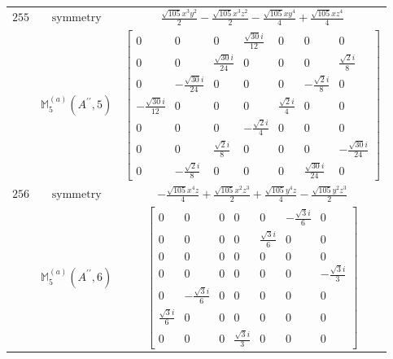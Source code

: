 \documentclass[fleqn,8pt,landscape]{jsarticle}
\begin{document}
\begin{longtable}{ccc}
$ 255 $ & $ \text{symmetry} $ & $ \frac{\sqrt{105} x^{3} y^{2}}{2} - \frac{\sqrt{105} x^{3} z^{2}}{2} - \frac{\sqrt{105} x y^{4}}{4} + \frac{\sqrt{105} x z^{4}}{4} $ \\
$  $ & $ \mathbb{M}_{5}^{(a)}(A^{\prime\prime},5) $ & $ \begin{bmatrix} 0 & 0 & 0 & \frac{\sqrt{30} i}{12} & 0 & 0 & 0 \\ 0 & 0 & \frac{\sqrt{30} i}{24} & 0 & 0 & 0 & \frac{\sqrt{2} i}{8} \\ 0 & - \frac{\sqrt{30} i}{24} & 0 & 0 & 0 & - \frac{\sqrt{2} i}{8} & 0 \\ - \frac{\sqrt{30} i}{12} & 0 & 0 & 0 & \frac{\sqrt{2} i}{4} & 0 & 0 \\ 0 & 0 & 0 & - \frac{\sqrt{2} i}{4} & 0 & 0 & 0 \\ 0 & 0 & \frac{\sqrt{2} i}{8} & 0 & 0 & 0 & - \frac{\sqrt{30} i}{24} \\ 0 & - \frac{\sqrt{2} i}{8} & 0 & 0 & 0 & \frac{\sqrt{30} i}{24} & 0 \end{bmatrix} $ \\ \hline
$ 256 $ & $ \text{symmetry} $ & $ - \frac{\sqrt{105} x^{4} z}{4} + \frac{\sqrt{105} x^{2} z^{3}}{2} + \frac{\sqrt{105} y^{4} z}{4} - \frac{\sqrt{105} y^{2} z^{3}}{2} $ \\
$  $ & $ \mathbb{M}_{5}^{(a)}(A^{\prime\prime},6) $ & $ \begin{bmatrix} 0 & 0 & 0 & 0 & 0 & - \frac{\sqrt{3} i}{6} & 0 \\ 0 & 0 & 0 & 0 & \frac{\sqrt{3} i}{6} & 0 & 0 \\ 0 & 0 & 0 & 0 & 0 & 0 & 0 \\ 0 & 0 & 0 & 0 & 0 & 0 & - \frac{\sqrt{3} i}{3} \\ 0 & - \frac{\sqrt{3} i}{6} & 0 & 0 & 0 & 0 & 0 \\ \frac{\sqrt{3} i}{6} & 0 & 0 & 0 & 0 & 0 & 0 \\ 0 & 0 & 0 & \frac{\sqrt{3} i}{3} & 0 & 0 & 0 \end{bmatrix} $ \\ \hline
\end{longtable}
\end{document}
